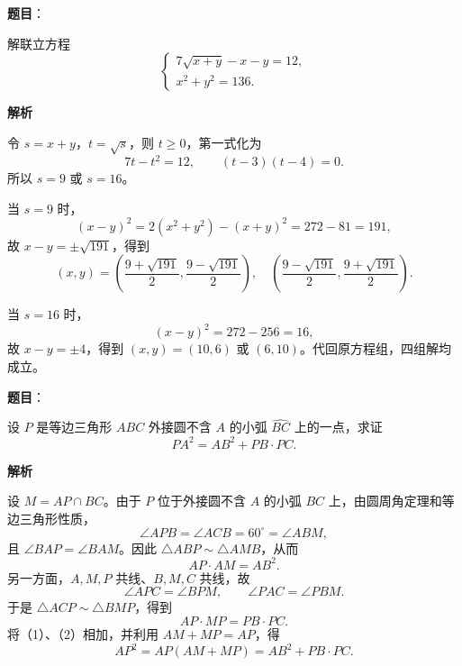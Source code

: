 \begin{answer}

\textbf{题目}：

解联立方程
\nopagebreak[4]
\[
\begin{cases}
7\sqrt{x+y}-x-y=12,\\
x^2+y^2=136.
\end{cases}
\]

\textbf{解析}

令 $s=x+y$，$t=\sqrt{s}$，则 $t\geqslant0$，第一式化为
\nopagebreak[4]
\[
7t-t^2=12,
\qquad (t-3)(t-4)=0.
\]
所以 $s=9$ 或 $s=16$。

当 $s=9$ 时，
\nopagebreak[4]
\[
(x-y)^2=2(x^2+y^2)-(x+y)^2=272-81=191,
\]
故 $x-y=\pm\sqrt{191}$，得到
\nopagebreak[4]
\[
(x,y)=\left(\frac{9+\sqrt{191}}2,\frac{9-\sqrt{191}}2\right),
\quad
\left(\frac{9-\sqrt{191}}2,\frac{9+\sqrt{191}}2\right).
\]

当 $s=16$ 时，
\nopagebreak[4]
\[
(x-y)^2=272-256=16,
\]
故 $x-y=\pm4$，得到 $(x,y)=(10,6)$ 或 $(6,10)$。代回原方程组，四组解均成立。


\end{answer}
\begin{answer}

\textbf{题目}：

设 $P$ 是等边三角形 $ABC$ 外接圆不含 $A$ 的小弧 $\widehat{BC}$ 上的一点，求证
\nopagebreak[4]
\[
PA^2=AB^2+PB\cdot PC.
\]

\textbf{解析}

设 $M=AP\cap BC$。由于 $P$ 位于外接圆不含 $A$ 的小弧 $BC$ 上，由圆周角定理和等边三角形性质，
\nopagebreak[4]
\[
\angle APB=\angle ACB=60^\circ=\angle ABM,
\]
且 $\angle BAP=\angle BAM$。因此 $\triangle ABP\sim\triangle AMB$，从而
\nopagebreak[4]
\[
AP\cdot AM=AB^2.\tag{1}
\]
另一方面，$A,M,P$ 共线、$B,M,C$ 共线，故
\nopagebreak[4]
\[
\angle APC=\angle BPM,\qquad \angle PAC=\angle PBM.
\]
于是 $\triangle ACP\sim\triangle BMP$，得到
\nopagebreak[4]
\[
AP\cdot MP=PB\cdot PC.\tag{2}
\]
将（1）、（2）相加，并利用 $AM+MP=AP$，得
\nopagebreak[4]
\[
AP^2=AP(AM+MP)=AB^2+PB\cdot PC.
\]


\end{answer}

